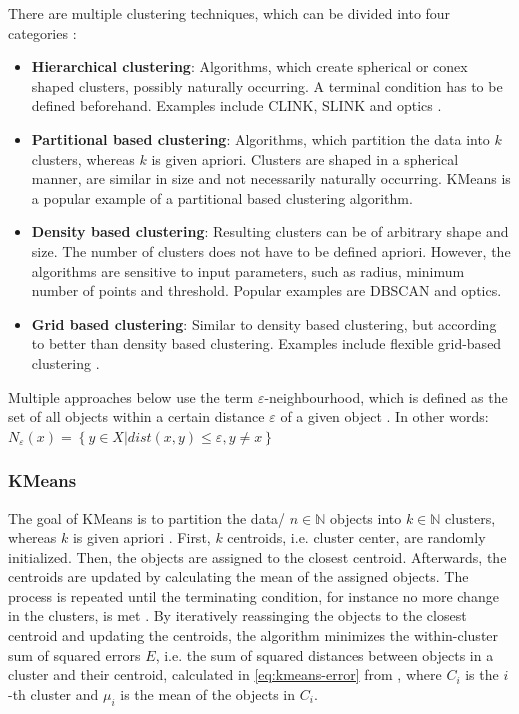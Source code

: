 There are multiple clustering techniques, which can be divided into four categories \cite{OPTICS2016}: 
\begin{itemize}
    \item \textbf{Hierarchical clustering}:
    Algorithms, which create spherical or conex shaped clusters, possibly naturally occurring. 
    A terminal condition has to be defined beforehand.
    Examples include CLINK, SLINK \cite{OPTICS2014} and \ac{optics} \cite{OPTICS2013}.

    \item \textbf{Partitional based clustering}: 
    Algorithms, which partition the data into $k$ clusters, whereas $k$ is given apriori.
    Clusters are shaped in a spherical manner, are similar in size and not necessarily naturally occurring.
    KMeans is a popular example of a partitional based clustering algorithm.

    \item \textbf{Density based clustering}:
    Resulting clusters can be of arbitrary shape and size.
    The number of clusters does not have to be defined apriori.
    However, the algorithms are sensitive to input parameters, such as radius, minimum number of points and threshold.
    Popular examples are DBSCAN and \ac{optics}.
    
    \item \textbf{Grid based clustering}:
    Similar to density based clustering, but according to \citeauthor{OPTICS2016} better than density based clustering.
    Examples include flexible grid-based clustering \cite{OPTICS2014}.
    
\end{itemize}

Multiple approaches below use the term $\varepsilon$-neighbourhood, which is defined as the set of all objects within a certain distance $\varepsilon$ of a given object \cite{OPTICS2013}.
In other words: $N_\varepsilon (x) = \left\{ y \in X | dist(x,y) \le \varepsilon, y \neq x \right\}$ 


\subsubsection{KMeans}\label{subsec:kmeans}

The goal of KMeans is to partition the data/ $n \in \mathbb{N}$  objects into $k \in \mathbb{N}$  clusters, whereas $k$ is given apriori \cite{OPTICS_kMeans_2016}. %
First, $k$ centroids, i.e. cluster center, are randomly initialized.
Then, the objects are assigned to the closest centroid.
Afterwards, the centroids are updated by calculating the mean of the assigned objects.
The process is repeated until the terminating condition, for instance no more change in the clusters, is met \cite{OPTICS_kMeans_2016}.
By iteratively reassinging the objects to the closest centroid and updating the centroids, 
the algorithm minimizes the within-cluster sum of squared errors $E$, i.e. the sum of squared distances between objects in a cluster and their centroid, 
calculated in \autoref{eq:kmeans-error} from \cite{OPTICS_kMeans_2016}, 
where $C_{i}$ is the $i$-th cluster and $\mu_{i}$ is the mean of the objects in $C_{i}$.

